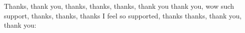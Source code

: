 Thanks, thank you, thanks, thanks, thanks, thank you thank you, wow such support, thanks, thanks, thanks I feel so supported, thanks thanks, thank you, thank you: 







